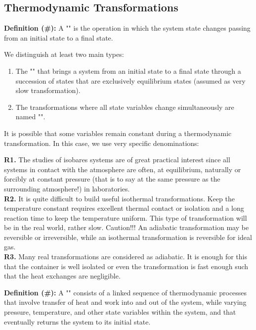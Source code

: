 	\subsection{Thermodynamic Transformations}
	\textbf{Definition (\#\mydef):} A "" is the operation in which the system state changes passing from an initial state to a final state.

	We distinguish at least two main types:
	\begin{enumerate}
		\item The "" that brings a system from an initial state to a final state through a succession of states that are exclusively equilibrium states (assumed as very slow transformation).

		\item The transformations where all state variables change simultaneously are named "".
	\end{enumerate}
	It is possible that some variables remain constant during a thermodynamic transformation. In this case, we use very specific denominations:
	
	\begin{tcolorbox}[title=Remarks,colframe=black,arc=10pt]
	\textbf{R1.} The studies of isobares systems are of great practical interest since all systems in contact with the atmosphere are often, at equilibrium, naturally or forcibly at constant pressure (that is to say at the same pressure as the surrounding atmosphere!) in laboratories.\\
	
	\textbf{R2.} It is quite difficult to build useful isothermal transformations. Keep the temperature constant requires excellent thermal contact or isolation and a long reaction time to keep the temperature uniform. This type of transformation will be in the real world, rather slow. Caution!!! An adiabatic transformation may be reversible or irreversible, while an isothermal transformation is reversible for ideal gas.\\
	
	\textbf{R3.} Many real transformations are considered as adiabatic. It is enough for this that the container is well isolated or even the transformation is fast enough such that the heat exchanges are negligible.
	\end{tcolorbox}
	\textbf{Definition (\#\mydef):} A "" consists of a linked sequence of thermodynamic processes that involve transfer of heat and work into and out of the system, while varying pressure, temperature, and other state variables within the system, and that eventually returns the system to its initial state.
	
